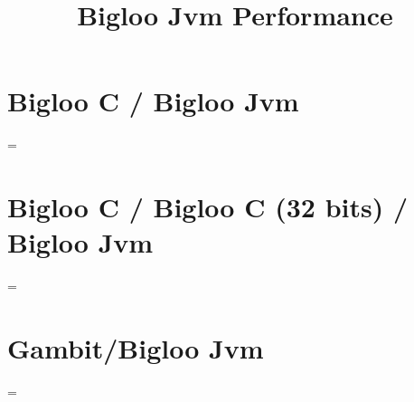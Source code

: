 \documentclass[10pt]{article}
\begin{document}
\title{Bigloo Jvm Performance}
\maketitle


\section{Bigloo C / Bigloo Jvm}

\begin{center}
\begin{footnotesize}

\end{footnotesize}

\vspace{1cm}

\epsfxsize=\linewidth
{}

\end{center}

\section{Bigloo C / Bigloo C (32 bits) / Bigloo Jvm}

\begin{center}
\begin{footnotesize}

\end{footnotesize}

\vspace{1cm}

\epsfxsize=\linewidth
{}

\end{center}

\section{Gambit/Bigloo Jvm}

\begin{center}
\begin{footnotesize}

\end{footnotesize}

\vspace{1cm}

\epsfxsize=\linewidth
{}

\end{center}
\end{document}
